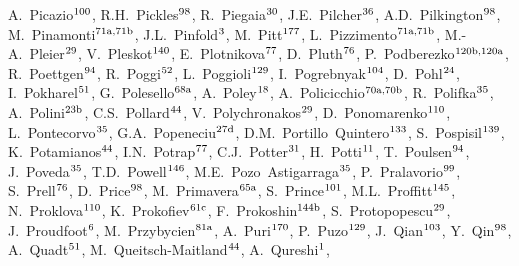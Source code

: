 \begin{flushleft}
A.~Picazio$^\textrm{\scriptsize 100}$,    
R.H.~Pickles$^\textrm{\scriptsize 98}$,    
R.~Piegaia$^\textrm{\scriptsize 30}$,    
J.E.~Pilcher$^\textrm{\scriptsize 36}$,    
A.D.~Pilkington$^\textrm{\scriptsize 98}$,    
M.~Pinamonti$^\textrm{\scriptsize 71a,71b}$,    
J.L.~Pinfold$^\textrm{\scriptsize 3}$,    
M.~Pitt$^\textrm{\scriptsize 177}$,    
L.~Pizzimento$^\textrm{\scriptsize 71a,71b}$,    
M.-A.~Pleier$^\textrm{\scriptsize 29}$,    
V.~Pleskot$^\textrm{\scriptsize 140}$,    
E.~Plotnikova$^\textrm{\scriptsize 77}$,    
D.~Pluth$^\textrm{\scriptsize 76}$,    
P.~Podberezko$^\textrm{\scriptsize 120b,120a}$,    
R.~Poettgen$^\textrm{\scriptsize 94}$,    
R.~Poggi$^\textrm{\scriptsize 52}$,    
L.~Poggioli$^\textrm{\scriptsize 129}$,    
I.~Pogrebnyak$^\textrm{\scriptsize 104}$,    
D.~Pohl$^\textrm{\scriptsize 24}$,    
I.~Pokharel$^\textrm{\scriptsize 51}$,    
G.~Polesello$^\textrm{\scriptsize 68a}$,    
A.~Poley$^\textrm{\scriptsize 18}$,    
A.~Policicchio$^\textrm{\scriptsize 70a,70b}$,    
R.~Polifka$^\textrm{\scriptsize 35}$,    
A.~Polini$^\textrm{\scriptsize 23b}$,    
C.S.~Pollard$^\textrm{\scriptsize 44}$,    
V.~Polychronakos$^\textrm{\scriptsize 29}$,    
D.~Ponomarenko$^\textrm{\scriptsize 110}$,    
L.~Pontecorvo$^\textrm{\scriptsize 35}$,    
G.A.~Popeneciu$^\textrm{\scriptsize 27d}$,    
D.M.~Portillo~Quintero$^\textrm{\scriptsize 133}$,    
S.~Pospisil$^\textrm{\scriptsize 139}$,    
K.~Potamianos$^\textrm{\scriptsize 44}$,    
I.N.~Potrap$^\textrm{\scriptsize 77}$,    
C.J.~Potter$^\textrm{\scriptsize 31}$,    
H.~Potti$^\textrm{\scriptsize 11}$,    
T.~Poulsen$^\textrm{\scriptsize 94}$,    
J.~Poveda$^\textrm{\scriptsize 35}$,    
T.D.~Powell$^\textrm{\scriptsize 146}$,    
M.E.~Pozo~Astigarraga$^\textrm{\scriptsize 35}$,    
P.~Pralavorio$^\textrm{\scriptsize 99}$,    
S.~Prell$^\textrm{\scriptsize 76}$,    
D.~Price$^\textrm{\scriptsize 98}$,    
M.~Primavera$^\textrm{\scriptsize 65a}$,    
S.~Prince$^\textrm{\scriptsize 101}$,    
M.L.~Proffitt$^\textrm{\scriptsize 145}$,    
N.~Proklova$^\textrm{\scriptsize 110}$,    
K.~Prokofiev$^\textrm{\scriptsize 61c}$,    
F.~Prokoshin$^\textrm{\scriptsize 144b}$,    
S.~Protopopescu$^\textrm{\scriptsize 29}$,    
J.~Proudfoot$^\textrm{\scriptsize 6}$,    
M.~Przybycien$^\textrm{\scriptsize 81a}$,    
A.~Puri$^\textrm{\scriptsize 170}$,    
P.~Puzo$^\textrm{\scriptsize 129}$,    
J.~Qian$^\textrm{\scriptsize 103}$,    
Y.~Qin$^\textrm{\scriptsize 98}$,    
A.~Quadt$^\textrm{\scriptsize 51}$,    
M.~Queitsch-Maitland$^\textrm{\scriptsize 44}$,    
A.~Qureshi$^\textrm{\scriptsize 1}$,    

\end{flushleft}
